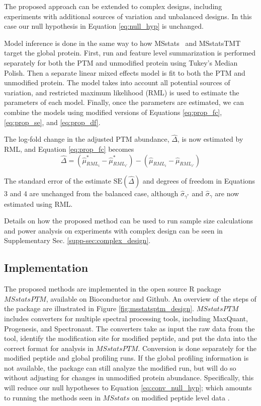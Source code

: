 \documentclass[mcp]{article}
\numberwithin{table}{section}
\begin{document}
The proposed approach can be extended to complex designs, including experiments with additional sources of variation and unbalanced designs. In this case our null hypothesis in Equation \ref{eq:null_hyp} is unchanged.

Model inference is done in the same way to how MSstats~\cite{Choi:2014} and MSstatsTMT~\cite{Huang:2020} target the global protein. First, run and feature level summarization is performed separately for both the PTM and unmodified protein using Tukey's Median Polish. Then a separate linear mixed effects model is fit to both the PTM and unmodified protein. The model takes into account all potential sources of variation, and restricted maximum likelihood (RML) is used to estimate the parameters of each model. Finally, once the parameters are estimated, we can combine the models using modified versions of Equations \ref{eq:prop_fc}, \ref{eq:prop_se}, and \ref{eq:prop_df}.

The log-fold change in the adjusted PTM abundance, $\hat{\Delta
}$, is now estimated by RML, and Equation \ref{eq:prop_fc} becomes 
\begin{equation}
\hat{\Delta} = (\hat{\mu}_{RML_i}^{\ast} - \hat{\mu}_{RML_{i'}}^{\ast}) - (\hat{\mu}_{RML_i} - \hat{\mu}_{RML_{i'}})
\end{equation}

The standard error of the estimate $\mathrm{SE}(\hat{\Delta})$ and degrees of freedom in Equations 3 and 4 are unchanged from the balanced case, although $\hat{\sigma}_{\gamma^\ast}$ and $\hat{\sigma}_{\gamma}$ are now estimated using RML.

Details on how the proposed method can be used to run sample size calculations and power analysis on experiments with complex design can be seen in Supplementary Sec. \ref{supp-sec:complex_design}.

\subsection*{Implementation}

The proposed methods are implemented in the open source R package $MSstatsPTM$, available on Bioconductor and Github. An overview of the steps of the package are illustrated in Figure \ref{fig:msstatsptm_design}. $MSstatsPTM$ includes converters for multiple spectral processing tools, including MaxQuant, Progenesis, and Spectronaut. The converters take as input the raw data from the tool, identify the modification site for modified peptide, and put the data into the correct format for analysis in $MSstatsPTM$. Conversion is done separately for the modified peptide and global profiling runs. If the global profiling information is not available, the package can still analyze the modified run, but will do so without adjusting for changes in unmodified protein abundance. Specifically, this will reduce our null hypotheses to Equation \ref{eq:conv_null_hyp}; which amounts to running the methods seen in $MSstats$ on modified peptide level data \cite{Choi:2014} \cite{Huang:2020}.
\end{document}
